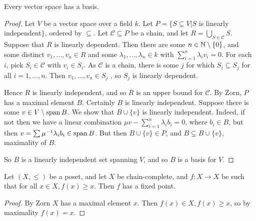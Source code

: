 \documentclass[10pt,a4paper]{article}
\begin{document}
\begin{corollary}
Every vector space has a basis.
\end{corollary}
\begin{proof}
Let $V$ be a vector space over a field $k$. Let $P = \{S \subseteq V | S$ is linearly independent$\}$, ordered by $\subseteq$. Let $\mathscr{C} \subseteq P$ be a chain, and let $R = \bigcup_{S \in \mathscr{C}}S$. Suppose that $R$ is linearly dependent. Then there are some $n \in \mathbb{N}\setminus\{0\}$, and some distinct $v_1, \ldots, v_n \in R$ and some $\lambda_1, \ldots, \lambda_n \in k$ with $\sum_{i=1}^n \lambda_i v_i = 0$. For each $i$, pick $S_i \in \mathscr{C}$ with $v_i \in S_i$. As $\mathscr{C}$ is a chain, there is some $j$ for which $S_i \subseteq S_j$ for all $i =1, \ldots, n$. Then $v_1, \ldots, v_n \in S_j$ , so $S_j$ is linearly dependent. \contr

Hence $R$ is linearly independent, and so $R$ is an upper bound for $\mathscr{C}$. By Zorn, $P$  has a maximal element $B$. Certainly $B$ is linearly independent. Suppose there is some $v \in V \setminus \operatorname{span}{B}$. We show that $B \cup\{v\}$ is linearly independent. Indeed, if not then we have a linear combination $\mu v - \sum_{i=1}^n \lambda_i b_i = 0$, where $b_i \in B$, but then $v = \sum \mu^{-1}\lambda_i b_i \in \operatorname{span}{B}$\contr. But then $B\cup\{v\} \in P$, and $B \subsetneq B\cup\{v\}$, \contr maximality of $B$.

So $B$ is a linearly independent set spanning $V$, and so $B$ is a basis for $V$.
\end{proof}

\begin{corollary}
Let $(X, \leq)$ be a poset, and let $X$ be chain-complete, and $f: X \to X$ be such that for all $x \in X, f(x) \geq x$. Then $f$ has a fixed point.
\end{corollary}
\begin{proof}
By Zorn $X$ has a maximal element $x$. Then $f(x) \in X, f(x) \geq x$, so by maximality $f(x) = x$.
\end{proof}
\end{document}
